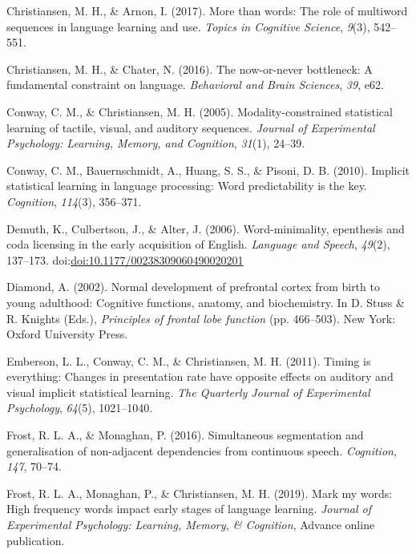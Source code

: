 \documentclass[man,mask,floatsintext]{apa6}
\theoremstyle{definition}
\theoremstyle{definition}
\theoremstyle{definition}
\theoremstyle{remark}
\begin{document}
\hypertarget{ref-christiansen2017more}{}
Christiansen, M. H., \& Arnon, I. (2017). More than words: The role of
multiword sequences in language learning and use. \emph{Topics in
Cognitive Science}, \emph{9}(3), 542--551.

\hypertarget{ref-christiansen2016now}{}
Christiansen, M. H., \& Chater, N. (2016). The now-or-never bottleneck:
A fundamental constraint on language. \emph{Behavioral and Brain
Sciences}, \emph{39}, e62.

\hypertarget{ref-conway2005modality}{}
Conway, C. M., \& Christiansen, M. H. (2005). Modality-constrained
statistical learning of tactile, visual, and auditory sequences.
\emph{Journal of Experimental Psychology: Learning, Memory, and
Cognition}, \emph{31}(1), 24--39.

\hypertarget{ref-conway2010implicit}{}
Conway, C. M., Bauernschmidt, A., Huang, S. S., \& Pisoni, D. B. (2010).
Implicit statistical learning in language processing: Word
predictability is the key. \emph{Cognition}, \emph{114}(3), 356--371.

\hypertarget{ref-demuth2006word}{}
Demuth, K., Culbertson, J., \& Alter, J. (2006). Word-minimality,
epenthesis and coda licensing in the early acquisition of English.
\emph{Language and Speech}, \emph{49}(2), 137--173.
doi:\href{https://doi.org/doi:10.1177/00238309060490020201}{doi:10.1177/00238309060490020201}

\hypertarget{ref-diamond2002normal}{}
Diamond, A. (2002). Normal development of prefrontal cortex from birth
to young adulthood: Cognitive functions, anatomy, and biochemistry. In
D. Stuss \& R. Knights (Eds.), \emph{Principles of frontal lobe
function} (pp. 466--503). New York: Oxford University Press.

\hypertarget{ref-emberson2011timing}{}
Emberson, L. L., Conway, C. M., \& Christiansen, M. H. (2011). Timing is
everything: Changes in presentation rate have opposite effects on
auditory and visual implicit statistical learning. \emph{The Quarterly
Journal of Experimental Psychology}, \emph{64}(5), 1021--1040.

\hypertarget{ref-frost2016simultaneous}{}
Frost, R. L. A., \& Monaghan, P. (2016). Simultaneous segmentation and
generalisation of non-adjacent dependencies from continuous speech.
\emph{Cognition}, \emph{147}, 70--74.

\hypertarget{ref-frost2019}{}
Frost, R. L. A., Monaghan, P., \& Christiansen, M. H. (2019). Mark my
words: High frequency words impact early stages of language learning.
\emph{Journal of Experimental Psychology: Learning, Memory, \&
Cognition}, Advance online publication.
\end{document}
